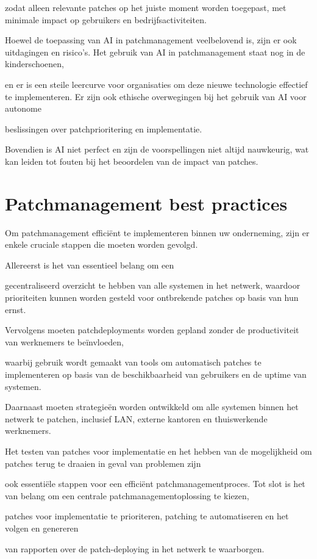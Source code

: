 zodat alleen relevante patches op het juiste moment worden toegepast, met minimale impact op gebruikers en bedrijfsactiviteiten.

Hoewel de toepassing van AI in patchmanagement veelbelovend is, zijn er ook uitdagingen en risico's. Het gebruik van AI in patchmanagement staat nog in de kinderschoenen, 

en er is een steile leercurve voor organisaties om deze nieuwe technologie effectief te implementeren. Er zijn ook ethische overwegingen bij het gebruik van AI voor autonome 

beslissingen over patchprioritering en implementatie. 

Bovendien is AI niet perfect en zijn de voorspellingen niet altijd nauwkeurig, wat kan leiden tot fouten bij het beoordelen van de impact van patches. \autocite{OFlaherty2023}

\section{Patchmanagement best practices}
Om patchmanagement efficiënt te implementeren binnen uw onderneming, zijn er enkele cruciale stappen die moeten worden gevolgd. 

Allereerst is het van essentieel belang om een 

gecentraliseerd overzicht te hebben van alle systemen in het netwerk, waardoor prioriteiten kunnen worden gesteld voor ontbrekende patches op basis van hun ernst. 

Vervolgens moeten patchdeployments worden gepland zonder de productiviteit van werknemers te beïnvloeden, 

waarbij gebruik wordt gemaakt van tools om automatisch patches te implementeren op basis van de beschikbaarheid van gebruikers en de uptime van systemen.

Daarnaast moeten strategieën worden ontwikkeld om alle systemen binnen het netwerk te patchen, inclusief LAN, externe kantoren en thuiswerkende werknemers. 

Het testen van patches voor implementatie en het hebben van de mogelijkheid om patches terug te draaien in geval van problemen zijn

ook essentiële stappen voor een efficiënt patchmanagementproces. Tot slot is het van belang om een centrale patchmanagementoplossing te kiezen,

patches voor implementatie te prioriteren, patching te automatiseren en het volgen en genereren 

van rapporten over de patch-deploying in het netwerk te waarborgen. \autocite{ManageEngine2024}


